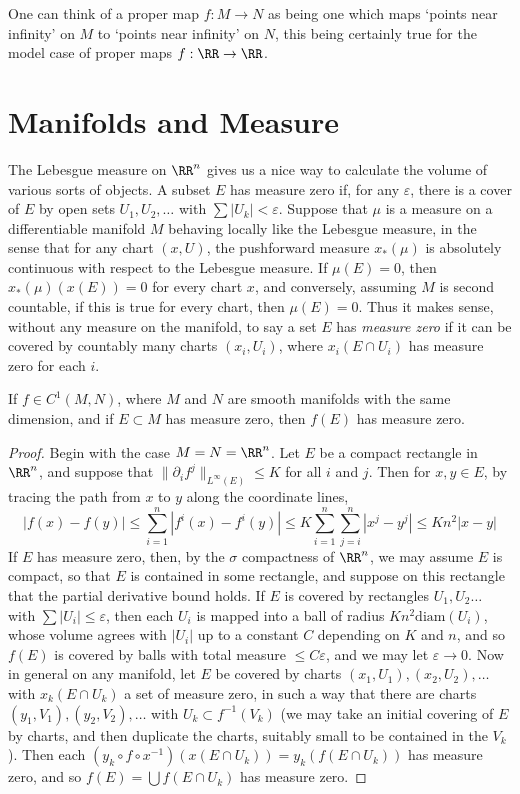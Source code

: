 One can think of a proper map $f: M \to N$ as being one which maps `points near infinity' on $M$ to `points near infinity' on $N$, this being certainly true for the model case of proper maps $f: \RR \to \RR$.

\section{Manifolds and Measure}

The Lebesgue measure on $\RR^n$ gives us a nice way to calculate the volume of various sorts of objects. A subset $E$ has measure zero if, for any $\varepsilon$, there is a cover of $E$ by open sets $U_1, U_2, \dots$ with $\sum |U_k| < \varepsilon$. Suppose that $\mu$ is a measure on a differentiable manifold $M$ behaving locally like the Lebesgue measure, in the sense that for any chart $(x,U)$, the pushforward measure $x_*(\mu)$ is absolutely continuous with respect to the Lebesgue measure. If $\mu(E) = 0$, then $x_*(\mu)(x(E)) = 0$ for every chart $x$, and conversely, assuming $M$ is second countable, if this is true for every chart, then $\mu(E) = 0$. Thus it makes sense, without any measure on the manifold, to say a set $E$ has \emph{measure zero} if it can be covered by countably many charts $(x_i,U_i)$, where $x_i(E \cap U_i)$ has measure zero for each $i$.

\begin{lemma}
    If $f \in C^1(M,N)$, where $M$ and $N$ are smooth manifolds with the same dimension, and if $E \subset M$ has measure zero, then $f(E)$ has measure zero.
\end{lemma}
\begin{proof}
    Begin with the case $M = N = \RR^n$. Let $E$ be a compact rectangle in $\RR^n$, and suppose that $\| \partial_i f^j \|_{L^\infty(E)} \leq K$ for all $i$ and $j$. Then for $x,y \in E$, by tracing the path from $x$ to $y$ along the coordinate lines,
    \[ |f(x) - f(y)| \leq \sum_{i = 1}^n |f^i(x) - f^i(y)| \leq K \sum_{i = 1}^n \sum_{j = i}^n |x^j - y^j| \leq Kn^2 |x-y| \]
    If $E$ has measure zero, then, by the $\sigma$ compactness of $\RR^n$, we may assume $E$ is compact, so that $E$ is contained in some rectangle, and suppose on this rectangle that the partial derivative bound holds. If $E$ is covered by rectangles $U_1, U_2 \dots$ with $\sum |U_i| \leq \varepsilon$, then each $U_i$ is mapped into a ball of radius $Kn^2 \text{diam}(U_i)$, whose volume agrees with $|U_i|$ up to a constant $C$ depending on $K$ and $n$, and so $f(E)$ is covered by balls with total measure $\leq C\varepsilon$, and we may let $\varepsilon \to 0$. Now in general on any manifold, let $E$ be covered by charts $(x_1,U_1), (x_2,U_2), \dots$ with $x_k(E \cap U_k)$ a set of measure zero, in such a way that there are charts $(y_1,V_1), (y_2,V_2), \dots$ with $U_k \subset f^{-1}(V_k)$ (we may take an initial covering of $E$ by charts, and then duplicate the charts, suitably small to be contained in the $V_k$). Then each $(y_k \circ f \circ x^{-1})(x(E \cap U_k)) = y_k(f(E \cap U_k))$ has measure zero, and so $f(E) = \bigcup f(E \cap U_k)$ has measure zero.
\end{proof}

